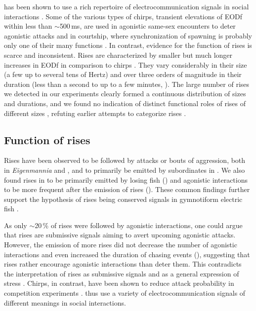 \lepto{} has been shown to use a rich repertoire of electrocommunication signals in social interactions \citep{Smith2013, Benda2020}. Some of the various types of chirps, transient elevations of EODf within less than $\sim$500\,ms, are used in agonistic same-sex encounters to deter agonistic attacks \citep{Hupe2008, Henninger2018} and in courtship, where synchronization of spawning is probably only one of their many functions \citep{Hagedorn1985, Triefenbach2003, Cuddy2012, Henninger2018}. In contrast, evidence for the function of rises is scarce and inconsistent. Rises are characterized by smaller but much longer increases in EODf in comparison to chirps \citep{Hopkins1974, Hagedorn1985}. They vary considerably in their size (a few up to several tens of Hertz) and over three orders of magnitude in their duration (less than a second to up to a few minutes, \citealp{Tallarovic2002}). The large number of rises we detected in our experiments clearly formed a continuous distribution of sizes and durations, and we found no indication of distinct functional roles of rises of different sizes \citep{Triefenbach2008}, refuting earlier attempts to categorize rises \citep{Hagedorn1985, Tallarovic2002,Dye1987}.

\subsection{Function of rises}

Rises have been observed to be followed by attacks or bouts of aggression, both in \textit{Eigenmannia} \citep{Hopkins1974} and \lepto{} \citep{Triefenbach2008}, and to primarily be emitted by subordinates in \Albi{} \citep{Serrano2003}. We also found rises in \lepto{} to be primarily emitted by losing fish () and agonistic interactions to be more frequent after the emission of rises (). These common findings further support the hypothesis of rises being conserved signals in gymnotiform electric fish \citep{Turner2007}.

As only $\sim$20\,\% of rises were followed by agonistic interactions, one could argue that rises are submissive signals aiming to avert upcoming agonistic attacks. However, the emission of more rises did not decrease the number of agonistic interactions and even increased the duration of chasing events (), suggesting that rises rather encourage agonistic interactions than deter them. This contradicts the interpretation of rises as submissive signals \citep{Hopkins1974,Serrano2003} and as a general expression of stress \citep{Smith2013}. Chirps, in contrast, have been shown to reduce attack probability in competition experiments \citep{Hupe2008}. \lepto{} thus use a variety of electrocommunication signals of different meanings in social interactions.

